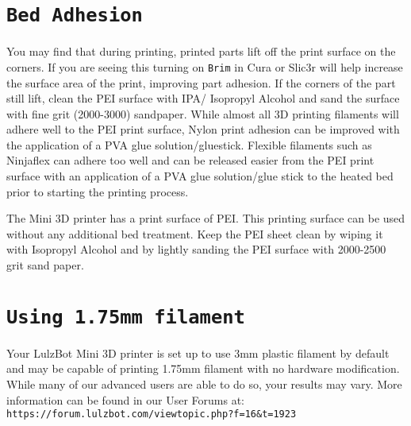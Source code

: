 \section{\texttt{Bed Adhesion}}
You may find that during printing, printed parts lift off the print surface on the corners. If you are seeing this turning on \texttt{Brim} in Cura or Slic3r will help increase the surface area of the print, improving part adhesion. If the corners of the part still lift, clean the PEI surface with IPA/ Isopropyl Alcohol and sand the surface with fine grit (2000-3000) sandpaper. While almost all 3D printing filaments will adhere well to the PEI print surface, Nylon print adhesion can be improved with the application of a PVA glue solution/gluestick. Flexible filaments such as Ninjaflex\textsuperscript{\miniscule{\textregistered}} can adhere too well and can be released easier from the PEI print surface with an application of a PVA glue solution/glue stick to the heated bed prior to starting the printing process.





The Mini 3D printer has a print surface of PEI. This printing surface can be used without any additional bed treatment. Keep the PEI sheet clean by wiping it with Isopropyl Alcohol and by lightly sanding the PEI surface with 2000-2500 grit sand paper.


\section{\texttt{Using 1.75mm filament}}

Your LulzBot Mini 3D printer is set up to use 3mm plastic filament by default and may be capable of printing 1.75mm filament with no hardware modification. While many of our advanced users are able to do so, your results may vary.  More information can be found in our User Forums at: \texttt{https://forum.lulzbot.com/viewtopic.php?f=16\&t=1923} 
